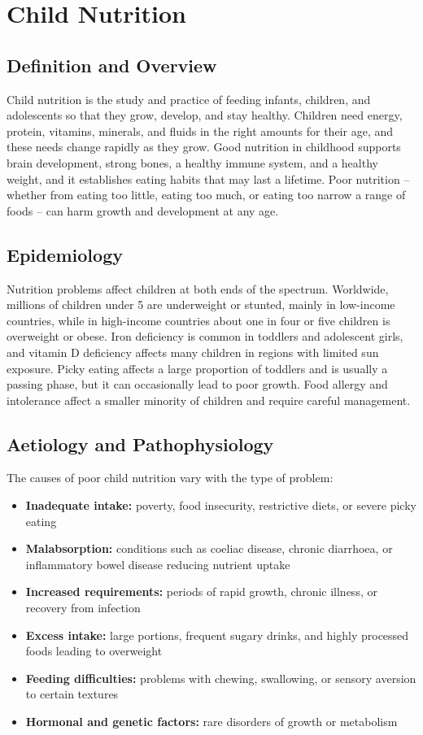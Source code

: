 \chapter{Child Nutrition}

\section*{Definition and Overview}
Child nutrition is the study and practice of feeding infants, children, and adolescents so that they grow, develop, and stay healthy. Children need energy, protein, vitamins, minerals, and fluids in the right amounts for their age, and these needs change rapidly as they grow. Good nutrition in childhood supports brain development, strong bones, a healthy immune system, and a healthy weight, and it establishes eating habits that may last a lifetime. Poor nutrition -- whether from eating too little, eating too much, or eating too narrow a range of foods -- can harm growth and development at any age.

\section*{Epidemiology}
Nutrition problems affect children at both ends of the spectrum. Worldwide, millions of children under 5 are underweight or stunted, mainly in low-income countries, while in high-income countries about one in four or five children is overweight or obese. Iron deficiency is common in toddlers and adolescent girls, and vitamin D deficiency affects many children in regions with limited sun exposure. Picky eating affects a large proportion of toddlers and is usually a passing phase, but it can occasionally lead to poor growth. Food allergy and intolerance affect a smaller minority of children and require careful management.

\section*{Aetiology and Pathophysiology}
The causes of poor child nutrition vary with the type of problem:

\begin{itemize}
    \item \textbf{Inadequate intake:} poverty, food insecurity, restrictive diets, or severe picky eating
    \item \textbf{Malabsorption:} conditions such as coeliac disease, chronic diarrhoea, or inflammatory bowel disease reducing nutrient uptake
    \item \textbf{Increased requirements:} periods of rapid growth, chronic illness, or recovery from infection
    \item \textbf{Excess intake:} large portions, frequent sugary drinks, and highly processed foods leading to overweight
    \item \textbf{Feeding difficulties:} problems with chewing, swallowing, or sensory aversion to certain textures
    \item \textbf{Hormonal and genetic factors:} rare disorders of growth or metabolism
\end{itemize}


